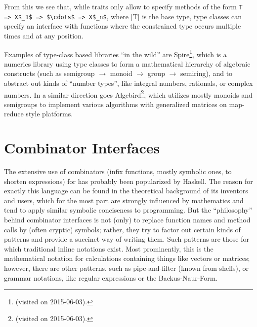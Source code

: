 From this we see that, while traits only allow to specify methods of the form %
\lstinline[mathescape,style=inline]|T => X$_1$ => $\cdots$ => X$_n$|, where |T| is the base type,
type classes can specify an interface with functions where the constrained type occurs multiple
times and at any position.

Examples of type-class based libraries \enquote{in the wild} are
Spire\footnote{\protect{}
  (visited on 2015-06-03).}, which is a numerics library using type classes to form a mathematical
hierarchy of algebraic constructs (such as semigroup \(\rightarrow\) monoid \(\rightarrow\) group
\(\rightarrow\) semiring), and to abstract out kinds of \enquote{number types}, like integral
numbers, rationals, or complex numbers. In a similar direction goes
Algebird\footnote{\protect{}
  (visited on 2015-06-03).}, which utilizes mostly monoids and semigroups to implement various
algorithms with generalized matrices on map-reduce style platforms.


\section{Combinator Interfaces}
\label{sec:combinators}

The extensive use of combinators (infix functions, mostly symbolic ones, to shorten expressions) for
\dsls{} has probably been popularized by Haskell. The reason for exactly this language can be found
in the theoretical background of its inventors and users, which for the most part are strongly
influenced by mathematics and tend to apply similar symbolic conciseness to programming. But the
\enquote{philosophy} behind combinator interfaces is not (only) to replace function names and method
calls by (often cryptic) symbols; rather, they try to factor out certain kinds of patterns and
provide a succinct way of writing them. Such patterns are those for which traditional inline
notations exist. Most prominently, this is the mathematical notation for calculations containing
things like vectors or matrices; however, there are other patterns, such as pipe-and-filter (known
from  shells), or grammar notations, like regular expressions or the Backus-Naur-Form.

